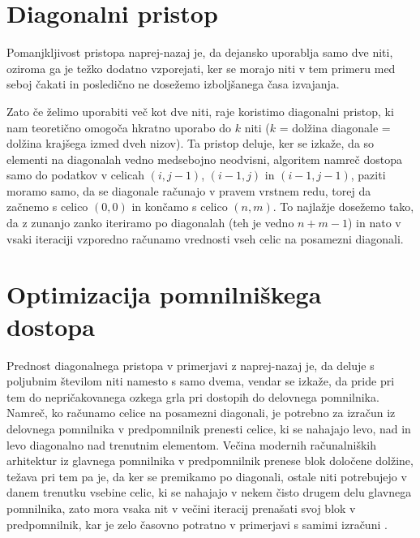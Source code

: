 \documentclass[a4paper,12pt,openright]{book}
\begin{document}
\section{Diagonalni pristop}

Pomanjkljivost pristopa naprej-nazaj je, da dejansko uporablja samo dve niti, oziroma ga je težko dodatno vzporejati, ker se morajo niti v tem primeru med seboj čakati in posledično ne dosežemo izboljšanega časa izvajanja. 

Zato če želimo uporabiti več kot dve niti, raje koristimo diagonalni pristop, ki nam teoretično omogoča hkratno uporabo do $k$ niti ($k$ = dolžina diagonale = dolžina krajšega izmed dveh nizov). Ta pristop deluje, ker se izkaže, da so elementi na diagonalah vedno medsebojno neodvisni, algoritem namreč dostopa samo do podatkov v celicah $(i, j-1)$, $(i-1, j)$ in $(i-1, j-1)$, paziti moramo samo, da se diagonale računajo v pravem vrstnem redu, torej da začnemo s celico $(0, 0)$ in končamo s celico $(n, m)$. To najlažje dosežemo tako, da z zunanjo zanko iteriramo po diagonalah (teh je vedno $n+m-1$) in nato v vsaki iteraciji vzporedno računamo vrednosti vseh celic na posamezni diagonali. 

\section{Optimizacija pomnilniškega dostopa}

Prednost diagonalnega pristopa v primerjavi z naprej-nazaj je, da deluje s poljubnim številom niti namesto s samo dvema, vendar se izkaže, da pride pri tem do nepričakovanega ozkega grla pri dostopih do delovnega pomnilnika. Namreč, ko računamo celice na posamezni diagonali, je potrebno za izračun iz delovnega pomnilnika v predpomnilnik prenesti celice, ki se nahajajo levo, nad in levo diagonalno nad trenutnim elementom. Večina modernih računalniških arhitektur iz glavnega pomnilnika v predpomnilnik prenese blok določene dolžine, težava pri tem pa je, da ker se premikamo po diagonali, ostale niti potrebujejo v danem trenutku vsebine celic, ki se nahajajo v nekem čisto drugem delu glavnega pomnilnika, zato mora vsaka nit v večini iteracij prenašati svoj blok v predpomnilnik, kar je zelo časovno potratno v primerjavi s samimi izračuni \cite{bottleneck}. 

\bigskip
\bigskip
\end{document}
